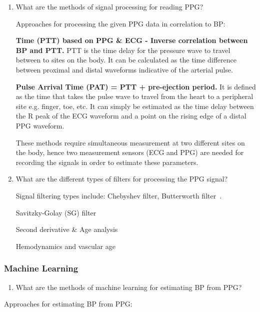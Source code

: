 \documentclass[12pt, bibliography=totoc]{scrartcl}
\begin{document}
\begin{enumerate}
\item What are the methods of signal processing for reading PPG?

Approaches for processing the given PPG data in correlation to BP:\newline

\textbf{Time (PTT) based on  PPG \& ECG - Inverse correlation between BP and PTT.} PTT is the time delay for the pressure wave to travel between to sites on the body. It can be calculated as the time difference between proximal and distal waveforms indicative of the arterial pulse.

\textbf{Pulse Arrival Time (PAT) = PTT + pre-ejection period.} It is defined as the time that takes the pulse wave to travel from the heart to a peripheral site e.g. finger, toe, etc. It can simply be estimated as the time delay between the R peak of the ECG waveform and a point on the rising edge of a distal PPG waveform.

These methods require simultaneous measurement at two different sites on the body, hence two measurement sensors (ECG and PPG) are needed for recording the signals in order to estimate these parameters.

\item What are the different types of filters for processing the PPG signal? 

Signal filtering types include: Chebyshev filter, Butterworth filter~\cite{liangOptimalFilterShort2018}.

Savitzky-Golay (SG) filter \cite{savitzkySmoothingDifferentiationData1964}

Second derivative \& Age analysis \cite{takazawaAssessmentVasoactiveAgents1998a}

Hemodynamics and vascular age \cite{charltonAssessingHemodynamicsPhotoplethysmogram2022}

\end{enumerate}

\subsubsection{Machine Learning}
\label{machine_learning}

\begin{enumerate}
\item What are the methods of machine learning for estimating BP from PPG?
\end{enumerate}

Approaches for estimating BP from PPG: \newline
\end{document}
